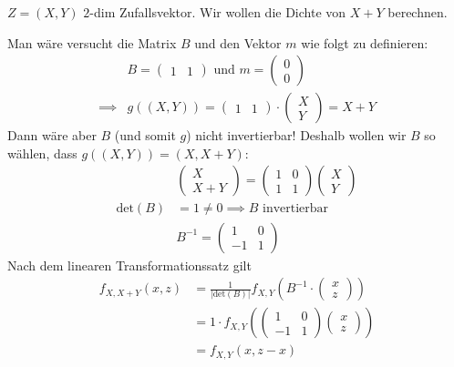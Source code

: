 $Z = (X, Y)$ $2$-dim Zufallsvektor. Wir wollen die Dichte von $X + Y$ berechnen.

Man wäre versucht die Matrix $B$ und den Vektor $m$ wie folgt zu definieren:
\begin{align*}
    &B= 
    \left(\begin{matrix}
        1 & 1
    \end{matrix}\right) 
    \text{ und } 
    m = \left(\begin{matrix}
        0\\
        0
    \end{matrix}\right)\\
    \implies &g((X,Y)) = 
    \left(\begin{matrix}
        1 & 1
    \end{matrix}\right) \cdot 
    \left(\begin{matrix}
        X\\
        Y
    \end{matrix}\right) = X + Y
\end{align*}
Dann wäre aber $B$ (und somit $g$) nicht invertierbar!
Deshalb wollen wir $B$ so wählen, dass $g((X,Y)) = (X, X + Y)$:
\begin{align*}
    &\left(\begin{matrix}
        X\\
        X + Y
    \end{matrix}\right) 
    = \left(\begin{matrix}
        1 & 0\\
        1 & 1
    \end{matrix}\right)
    \left(\begin{matrix}
        X\\
        Y
    \end{matrix}\right)\\
    \text{det}(B)&= 1 \neq 0 \implies B \text{ invertierbar}\\
    &B^{-1} = \left(\begin{matrix}
        1 & 0\\
        -1 & 1
    \end{matrix}\right)
\end{align*}
Nach dem linearen Transformationssatz gilt
\begin{align*}
    f_{X, X+Y}(x, z) &= \frac{1}{|\text{det}(B)|}f_{X, Y}\left(B^{-1}\cdot 
    \left(\begin{matrix}
        x\\
        z
    \end{matrix}\right)\right)\\
    &= 1 \cdot f_{X, Y}\left(\left(\begin{matrix}
        1 & 0\\
        -1 & 1
    \end{matrix}\right)\left(\begin{matrix}
        x\\
        z
    \end{matrix}\right)\right)\\
    &= f_{X, Y}\left(x, z-x\right)
\end{align*}
